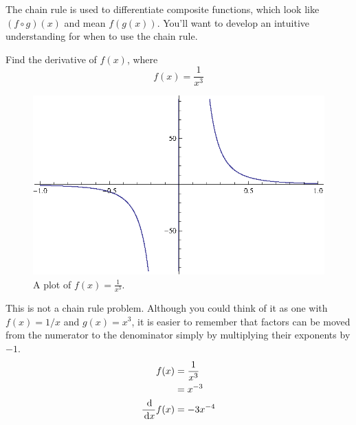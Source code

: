 The chain rule is used to differentiate composite functions, which look like $(f \circ g)(x)$ and mean $f(g(x))$. You'll want to develop an intuitive understanding for when to use the chain rule.
\begin{ex}
  Find the derivative of $f(x)$, where
  \[ f(x)=\frac{1}{x^3} \]
  \begin{figure}[h]
    \begin{center}
      \includegraphics{continuous/derivatives/chainrule_1.eps}
    \end{center}
    \caption{A plot of $f(x)=\frac{1}{x^3}$.}
  \end{figure}
  \begin{sol}
    This is not a chain rule problem. Although you could think of it as one with $f(x)=1/x$ and $g(x)=x^3$, it is easier to remember that factors can be moved from the numerator to the denominator simply by multiplying their exponents by $-1$.
    \begin{align*}
      f(x)&=\frac{1}{x^3}\\&=x^{-3} \\
      \frac{\,\mathrm{d}}{\,\mathrm{d} x} f(x)&=-3x^{-4}
    \end{align*}
  \end{sol}
\end{ex}
